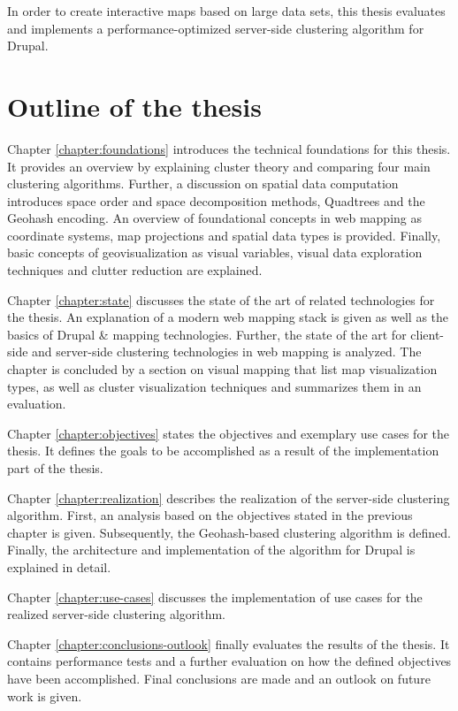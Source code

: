 In order to create interactive maps based on large data sets, this thesis evaluates and implements a performance-optimized server-side clustering algorithm for Drupal.


\section{Outline of the thesis}

Chapter \ref{chapter:foundations} introduces the technical foundations for this thesis. It provides an overview by explaining cluster theory and comparing four main clustering algorithms. Further, a discussion on spatial data computation introduces space order and space decomposition methods, Quadtrees and the Geohash encoding. An overview of foundational concepts in web mapping as coordinate systems, map projections and spatial data types is provided. Finally, basic concepts of geovisualization as visual variables, visual data exploration techniques and clutter reduction are explained. 

Chapter \ref{chapter:state} discusses the state of the art of related technologies for the thesis. An explanation of a modern web mapping stack is given as well as the basics of Drupal \& mapping technologies. Further, the state of the art for client-side and server-side clustering technologies in web mapping is analyzed. The chapter is concluded by a section on visual mapping that list map visualization types, as well as cluster visualization techniques and summarizes them in an evaluation. 

Chapter \ref{chapter:objectives} states the objectives and exemplary use cases for the thesis. It defines the goals to be accomplished as a result of the implementation part of the thesis.

Chapter \ref{chapter:realization} describes the realization of the server-side clustering algorithm. First, an analysis based on the objectives stated in the previous chapter is given. Subsequently, the Geohash-based clustering algorithm is defined. Finally, the architecture and implementation of the algorithm for Drupal is explained in detail.

Chapter \ref{chapter:use-cases} discusses the implementation of use cases for the realized server-side clustering algorithm.

Chapter \ref{chapter:conclusions-outlook} finally evaluates the results of the thesis. It contains performance tests and a further evaluation on how the defined objectives have been accomplished. Final conclusions are made and an outlook on future work is given.




